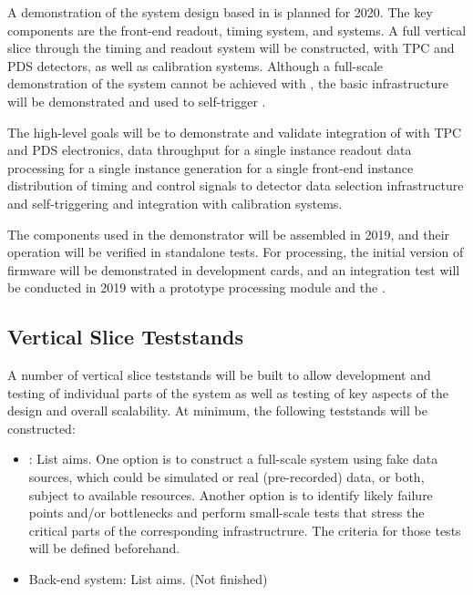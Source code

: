 A demonstration of the  system design based in  is
planned for 2020. The key components are the front-end readout, timing
system, and  systems. A full vertical slice through the
timing and readout system will be constructed, with
TPC and PDS detectors, as well as calibration systems. Although a full-scale
demonstration of the  system cannot be achieved with
, the basic infrastructure will be demonstrated and
used to self-trigger .

The high-level goals will be to demonstrate and validate
integration of  with TPC and PDS electronics, 
data throughput for a single  instance 
readout data processing for a single  instance 
 generation for a single front-end instance 
distribution of timing and control signals to detector  
data selection infrastructure and self-triggering  and 
integration with calibration systems.

The components used in the 
demonstrator will be assembled in 2019, and their operation will
be verified in standalone tests. For  processing, the
initial version of firmware will be demonstrated in  development
cards, and an integration test will be conducted in 2019 with a
prototype  processing module and the   .


\subsection{Vertical Slice Teststands}
\label{sec:sp-daq:validation-demonstrators}

A number of vertical slice teststands will be built to allow
development and testing of individual parts of the  system
as well as testing of key aspects of the design and overall scalability. At minimum, the following teststands
will be constructed:
\begin{itemize}
\item {}: List aims. One option is to construct a
  full-scale  system using fake data 
sources, which could be simulated or real (pre-recorded)
 data,
or both, subject to available resources. Another option is to identify
likely failure points and/or bottlenecks and perform
small-scale tests that stress the critical parts of the corresponding
infrastructrure. The criteria for those tests will be defined beforehand.
\item Back-end system: List aims. (Not finished)
\end{itemize}

